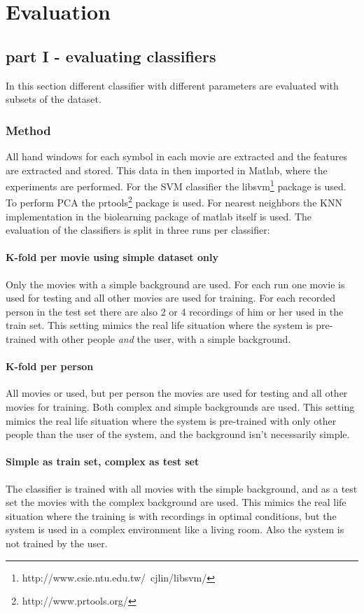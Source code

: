 \section{Evaluation}

\subsection{part I - evaluating classifiers}
In this section different classifier with different parameters are evaluated with subsets of the dataset.

\subsubsection{Method}
All hand windows for each symbol in each movie are extracted and the features are extracted and stored. This data in then imported in Matlab, where the experiments are performed. For the SVM classifier the libsvm\footnote{http://www.csie.ntu.edu.tw/~cjlin/libsvm/} package is used. To perform PCA the prtools\footnote{http://www.prtools.org/} package is used. For nearest neighbors the KNN implementation in the biolearning package of matlab itself is used. The evaluation of the classifiers is split in three runs per classifier:

\paragraph{K-fold per movie using simple dataset only}
Only the movies with a simple background are used. For each run one movie is used for testing and all other movies are used for training. For each recorded person in the test set there are also 2 or 4 recordings of him or her used in the train set. This setting mimics the real life situation where the system is pre-trained with other people \emph{and} the user, with a simple background.

\paragraph{K-fold per person}
All movies or used, but per person the movies are used for testing and all other movies for training. Both complex and simple backgrounds are used. This setting mimics the real life situation where the system is pre-trained with only other people than the user of the system, and the background isn't necessarily simple. 

\paragraph{Simple as train set, complex as test set}
The classifier is trained with all movies with the simple background, and as a test set the movies with the complex background are used. This mimics the real life situation where the training is with recordings in optimal conditions, but the system is used in a complex environment like a living room. Also the system is not trained by the user.


